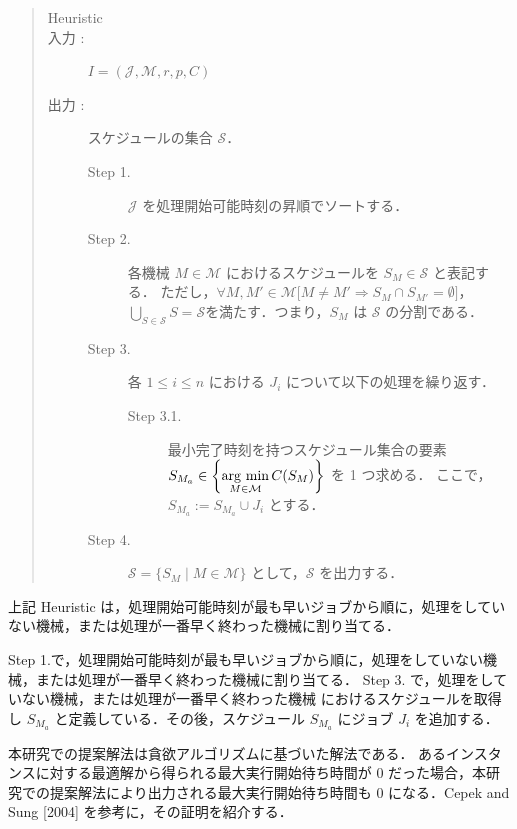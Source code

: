 \documentclass[12pt]{optlab-bachelor}
\newcommand{\argmin}{\mathop{\rm arg~min}\limits}
\begin{document}
\begin{quote}
  \begin{description}
    \item[{\sc Heuristic}]
    \item[入力 :] $I = (\mathcal{J}, \mathcal{M},r,p,C)$
    \item[出力 :] スケジュールの集合 $\mathcal{S}$．
    \begin{description}
      \item[Step 1.]
      $\mathcal{J}$ を処理開始可能時刻の昇順でソートする．
      \item[Step 2.]
      各機械 $M \in \mathcal{M}$ におけるスケジュールを $S_M \in \mathcal{S}$ と表記する．
      ただし，$\forall M, M' \in \mathcal{M}\big[M \neq M' \Rightarrow S_M \cap S_{M'} = \emptyset \big]$，$\displaystyle \bigcup_{S \in \mathcal{S}}S = \mathcal{S}$を満たす．つまり，$S_M$ は $\mathcal{S}$ の分割である．
      \item[Step 3.]
      各 $1 \le i \le n$ における $J_i$ について以下の処理を繰り返す．
      \begin{description}
        \item[Step 3.1.]
        最小完了時刻を持つスケジュール集合の要素 $S_{M_a} \in \left\{ \displaystyle \argmin_{M \in \mathcal{M}}C(S_M)\right\}$ を 1 つ求める．
        ここで，$S_{M_a} := S_{M_a} \cup J_i$ とする．
      \end{description}
      \item[Step 4.]
      $\mathcal{S} = \{ S_M \mid M \in \mathcal{M}\}$ として，$\mathcal{S}$ を出力する．
    \end{description}
  \end{description}
\end{quote}

上記 {\sc Heuristic} は，処理開始可能時刻が最も早いジョブから順に，処理をしていない機械，または処理が一番早く終わった機械に割り当てる．

Step 1.で，処理開始可能時刻が最も早いジョブから順に，処理をしていない機械，または処理が一番早く終わった機械に割り当てる．
Step 3. で，処理をしていない機械，または処理が一番早く終わった機械 におけるスケジュールを取得し $S_{M_a}$ と定義している．その後，スケジュール $S_{M_a}$ にジョブ $J_i$ を追加する．

本研究での提案解法は貪欲アルゴリズムに基づいた解法である．
あるインスタンスに対する最適解から得られる最大実行開始待ち時間が 0 だった場合，本研究での提案解法により出力される最大実行開始待ち時間も 0 になる．Cepek and Sung [2004] \cite{JIT} を参考に，その証明を紹介する．
\end{document}
